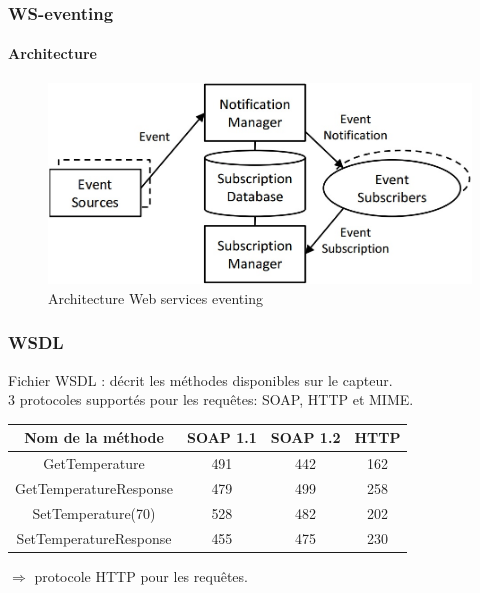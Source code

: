 \begin{frame}
 \frametitle{WS-eventing}
 \framesubtitle{Architecture}
 \begin{figure}
  \centering
  \includegraphics[scale=0.43]{figures/eventing.jpg}
  \caption{Architecture Web services eventing}
 \end{figure}
\end{frame}
\begin{frame}
 \frametitle{WSDL}
 Fichier WSDL : décrit les méthodes disponibles sur le capteur.\\ %
 3 protocoles supportés pour les requêtes: SOAP, HTTP et MIME.\\
 \vspace{3mm}
 \begin{center}
 \begin{tabular}{|c|c|c|c|}
 \hline
 Nom de la méthode & SOAP 1.1 & SOAP 1.2 & HTTP\\
 \hline
 GetTemperature & 491 & 442 & 162\\
 GetTemperatureResponse & 479 & 499 & 258\\
 SetTemperature(70) & 528 & 482 & 202\\
 SetTemperatureResponse & 455 & 475 & 230\\
 \hline
 \end{tabular}
 \end{center}
 $\Rightarrow$ protocole HTTP pour les requêtes.
\end{frame}
